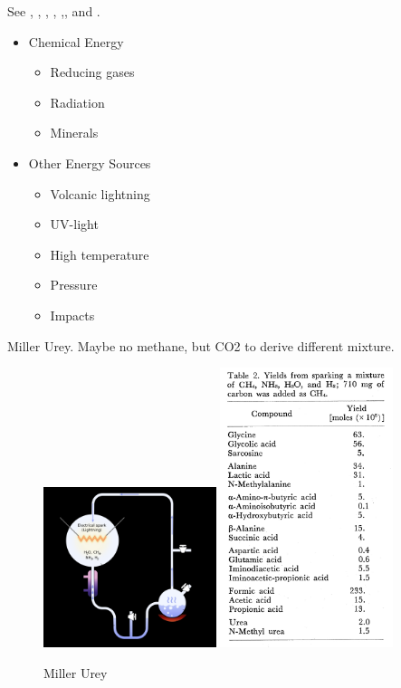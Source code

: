 \documentclass[]{article}
\begin{document}
See \cite{kitadai2018origins}, \cite{stueken2013did}, \cite{damer2016field}, \cite{miller1959organic}, \cite{ehrenfreund2002astrophysical},\cite{dalai2016incubating}, and \cite{chyba1997comets}.

\begin{itemize}
	\item Chemical Energy
	\begin{itemize}
		\item Reducing gases
		\item Radiation
		\item Minerals
	\end{itemize}
	\item Other Energy Sources
	\begin{itemize}
		\item Volcanic lightning
		\item UV-light
		\item High temperature
		\item Pressure
		\item Impacts
	\end{itemize}
\end{itemize}
Miller Urey. Maybe no methane, but CO2 to derive different mixture.

\begin{figure}[h!]
	\caption{Miller Urey \cite{miller1959organic}}
	\includegraphics[width=0.45\textwidth]{MillerUrey1}
	\includegraphics[width=0.45\textwidth]{MillerUrey2}
\end{figure}
\end{document}
